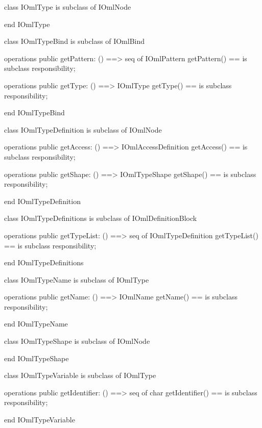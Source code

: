\begin{vdm_al}
class IOmlType
 is subclass of IOmlNode

end IOmlType
\end{vdm_al}

\begin{vdm_al}
class IOmlTypeBind
 is subclass of IOmlBind

operations
  public getPattern: () ==> seq of IOmlPattern
  getPattern() == is subclass responsibility;

operations
  public getType: () ==> IOmlType
  getType() == is subclass responsibility;

end IOmlTypeBind
\end{vdm_al}

\begin{vdm_al}
class IOmlTypeDefinition
 is subclass of IOmlNode

operations
  public getAccess: () ==> IOmlAccessDefinition
  getAccess() == is subclass responsibility;

operations
  public getShape: () ==> IOmlTypeShape
  getShape() == is subclass responsibility;

end IOmlTypeDefinition
\end{vdm_al}

\begin{vdm_al}
class IOmlTypeDefinitions
 is subclass of IOmlDefinitionBlock

operations
  public getTypeList: () ==> seq of IOmlTypeDefinition
  getTypeList() == is subclass responsibility;

end IOmlTypeDefinitions
\end{vdm_al}

\begin{vdm_al}
class IOmlTypeName
 is subclass of IOmlType

operations
  public getName: () ==> IOmlName
  getName() == is subclass responsibility;

end IOmlTypeName
\end{vdm_al}

\begin{vdm_al}
class IOmlTypeShape
 is subclass of IOmlNode

end IOmlTypeShape
\end{vdm_al}

\begin{vdm_al}
class IOmlTypeVariable
 is subclass of IOmlType

operations
  public getIdentifier: () ==> seq of char
  getIdentifier() == is subclass responsibility;

end IOmlTypeVariable
\end{vdm_al}

